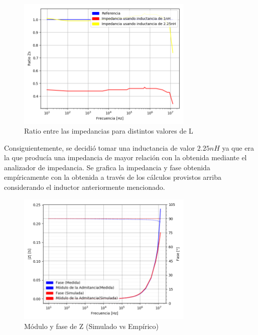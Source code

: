 \begin{figure}[H]
\centering
\includegraphics[width=0.75\textwidth]{Ejercicio_1(Germo)/Grafico/capacitor_relacion_entre_Z.png}
\caption{Ratio entre las impedancias para distintos valores de L}
\label{fig:capacitor_relacion_entre_Z}
\end{figure}


Consiguientemente, se decidió tomar una inductancia de valor $2.25nH$ ya que era la que producía una impedancia de mayor relación con la obtenida mediante el analizador de impedancia. Se grafica la impedancia y fase obtenida empíricamente con la obtenida a través de los cálculos provistos arriba considerando el inductor anteriormente mencionado.

\begin{figure}[H]
\centering
\includegraphics[width=0.75\textwidth]{Ejercicio_1(Germo)/Grafico/Capacitor_relacion_entre_Z_y_fases.png}
\caption{Módulo y fase de Z (Simulado vs Empírico)}
\label{fig:Capacitor_relacion_entre_Z_y_fases}
\end{figure}

